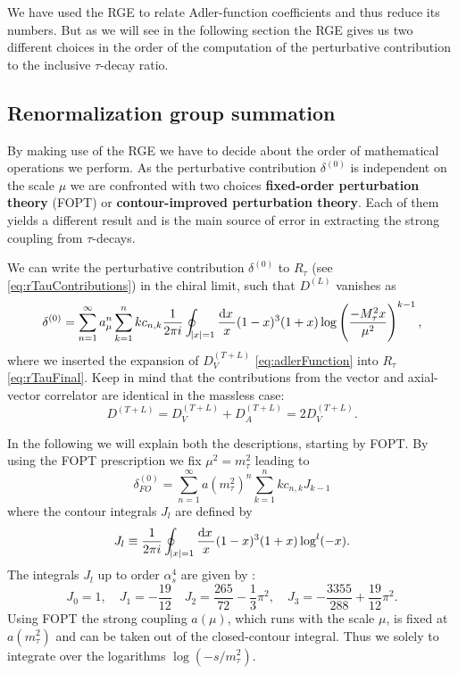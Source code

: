 \documentclass[../../index.tex]{subfiles}
\begin{document}
We have used the RGE to relate Adler-function coefficients and thus reduce its
numbers. But as we will see in the following section the RGE gives us two
different choices in the order of the computation of the perturbative
contribution to the inclusive $\tau$-decay ratio.

\subsection{Renormalization group summation}
By making use of the RGE we have to decide about the order of mathematical
operations we perform. As the perturbative contribution $\delta^{(0)}$ is
independent on the scale $\mu$ we are confronted with two choices
\textbf{fixed-order perturbation theory} (FOPT) or \textbf{contour-improved
  perturbation theory}. Each of them yields a different result and is the main
source of error in extracting the strong coupling from $\tau$-decays.

We can write the perturbative contribution $\delta^{(0)}$ to $R_\tau$ (see
\cref{eq:rTauContributions}) in the chiral limit, such that $D^{(L)}$ vanishes as
\begin{equation}
  \label{eq:rTauDelta0}
  \delta^{(0)} = \sum_{n=1}^{\infty} a_\mu^n \sum_{k=1}^n k c_{n,k} \frac{1}{2 \pi i} \oint_{\abs{x}=1} \frac{\dif x}{x} (1-x)^3(1+x) \log \left( \frac{-M_\tau^2 x}{\mu^2} \right)^{k-1},
\end{equation}
where we inserted the expansion of $D_V^{(T+L)}$ \cref{eq:adlerFunction} into
$R_\tau$ \cref{eq:rTauFinal}. Keep in mind that the contributions from the
vector and axial-vector correlator are identical in the massless case:
\begin{equation}
  D^{(T+L)} = D^{(T+L)}_V + D^{(T+L)}_A = 2 D^{(T+L)}_V.
\end{equation}

In the following we will explain both the descriptions, starting by FOPT. By
using the FOPT prescription we fix $\mu^2=m_\tau^2$ leading to
\begin{equation}
  \delta_{FO}^{(0)} = \sum_{n=1}^\infty a(m_\tau^2)^n \sum_{k=1}^n k c_{n,k} J_{k-1}
\end{equation}
where the contour integrals $J_l$ are defined by
\begin{equation}
  J_l \equiv \frac{1}{2\pi i} \oint_{\abs{x}=1} \frac{\dif x}{x} (1-x)^3(1+x) \log^l(-x).
\end{equation}
The integrals $J_l$ up to order $\alpha_s^4$ are given by \cite{Beneke2008}:
\begin{equation}
  J_0 = 1, \quad J_1 = -\frac{19}{12} \quad J_2 = \frac{265}{72} - \frac{1}{3} \pi^2, \quad J_3 = - \frac{3355}{288} + \frac{19}{12}\pi^2.
\end{equation}
Using FOPT the strong coupling $a(\mu)$, which runs with the scale $\mu$, is
fixed at $a(m_\tau^2)$ and can be taken out of the closed-contour integral. Thus
we solely to integrate over the logarithms $\log(-s/m_\tau^2)$.  
\end{document}
